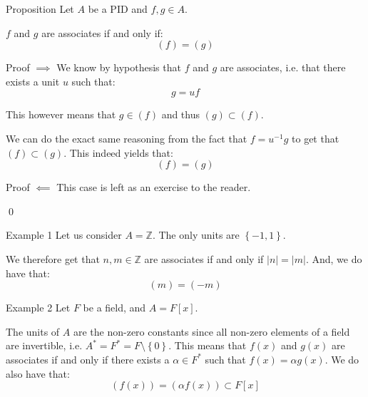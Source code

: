 \documentclass[a4paper]{article}
\begin{document}
\begin{parag}{Proposition}
    Let $A$ be a PID and $f, g \in A$.

    $f$ and $g$ are associates if and only if: 
    \[\left(f\right) = \left(g\right)\]

    \begin{subparag}{Proof $\implies$}
        We know by hypothesis that $f$ and $g$ are associates, i.e. that there exists a unit $u$ such that: 
        \[g = uf\]
        
        This however means that $g \in \left(f\right)$ and thus $\left(g\right) \subset \left(f\right)$.

        We can do the exact same reasoning from the fact that $f = u^{-1} g$ to get that $\left(f\right) \subset \left(g\right)$. This indeed yields that: 
        \[\left(f\right) = \left(g\right)\]
    \end{subparag}
    
    \begin{subparag}{Proof $\impliedby$}
        This case is left as an exercise to the reader.

        \qed
    \end{subparag}
\end{parag}

\begin{parag}{Example 1}
    Let us consider $A = \mathbb{Z}$. The only units are $\left\{-1, 1\right\}$. 

    We therefore get that $n, m \in \mathbb{Z}$ are associates if and only if $\left|n\right| = \left|m\right|$. And, we do have that: 
    \[\left(m\right) = \left(-m\right)\]
\end{parag}

\begin{parag}{Example 2}
    Let $F$ be a field, and $A = F\left[x\right]$.

    The units of $A$ are the non-zero constants since all non-zero elements of a field are invertible, i.e. $A^* = F^* = F \setminus \left\{0\right\}$. This means that $f\left(x\right)$ and $g\left(x\right)$ are associates if and only if there exists a $\alpha \in F^*$ such that $f\left(x\right) = \alpha g\left(x\right)$. We do also have that: 
    \[\left(f\left(x\right)\right) = \left(\alpha f\left(x\right)\right) \subset F\left[x\right]\]
\end{parag}
\end{document}
